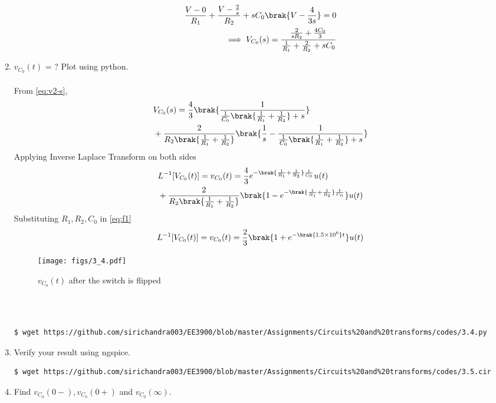 \documentclass[journal,12pt,twocolumn]{IEEEtran}
\renewcommand\thesection{\arabic{section}}
\begin{document}
\begin{enumerate}[label=\arabic*.,ref=\thesection.\theenumi]
\begin{align}
\frac{V - 0}{R_1} + \frac{V - \frac{2}{s}}{R_2} + sC_0\brak{V - \frac{4}{3s}} = 0 \\
\implies V_{C_0}(s) = \frac{\frac{2}{sR_2} + \frac{4C_0}{3}}{\frac{1}{R_1} + \frac{2}{R_2} + sC_0}
\label{eq:v2-s}
\end{align}
\item $v_{C_0}(t)$ = ? Plot using python.
\\
\solution
\\
From \eqref{eq:v2-s},
\begin{align}
&V_{C_0}(s) = \frac{4}{3}\brak{\frac{1}{\frac{1}{C_0}\brak{\frac{1}{R_1} + \frac{1}{R_2}}+s}} \nonumber \\
&+ \frac{2}{R_2\brak{\frac{1}{R_1} +\frac{1}{R_2}}}\brak{\frac{1}{s} - \frac{1}{\frac{1}{C_0}\brak{\frac{1}{R_1} + \frac{1}{R_2}} + s}}
\end{align}
Applying Inverse Laplace Transform on both sides
\begin{align}
&L^{-1}[V_{C_0}(t)]=v_{C_0}(t) = \frac{4}{3}e^{-\brak{\frac{1}{R_1} + \frac{1}{R_2}}\frac{t}{C_0}}u(t) \nonumber \\
&+ \frac{2}{R_2\brak{\frac{1}{R_1}+\frac{1}{R_2}}}\brak{1 - e^{-\brak{\frac{1}{R_1} + \frac{1}{R_2}}\frac{t}{C_0}}}u(t) \label{eq:f1}
\end{align}
Substituting $R_1, R_2, C_0$ in \eqref{eq:f1}
\begin{align}
L^{-1}[V_{C_0}(t)] =v_{C_0}(t)= \frac{2}{3}\brak{1 +e^{-\brak{1.5 \times 10^6}t}}u(t)
\label{eq:v2-t}
\end{align}
\begin{figure}[!htb]
\texttt{[image: figs/3\_4.pdf]}
\caption{$v_{C_0}(t)$ after the switch is flipped}
\label{fig:v2-t}
\end{figure} \\ \\
\begin{lstlisting}
$ wget https://github.com/sirichandra003/EE3900/blob/master/Assignments/Circuits%20and%20transforms/codes/3.4.py
\end{lstlisting}
\item Verify your result using ngspice. \\
\solution
\begin{lstlisting}
$ wget https://github.com/sirichandra003/EE3900/blob/master/Assignments/Circuits%20and%20transforms/codes/3.5.cir
\end{lstlisting}
\item Find $v_{C_0}(0-), v_{C_0}(0+)$ and  $v_{C_0}(\infty) $. \\

\end{enumerate}
\end{document}
